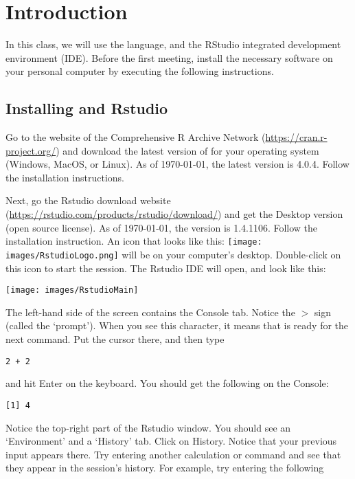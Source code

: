\hypertarget{intro}{%
\chapter{Introduction}\label{intro}}

In this class, we will use the \R language, and the RStudio integrated development environment (IDE). Before the first meeting, install the necessary software on your personal computer by executing the following instructions.

\hypertarget{installing-r-and-rstudio}{%
\section{Installing \R and Rstudio}\label{installing-r-and-rstudio}}

Go to the website of the Comprehensive R Archive Network (\url{https://cran.r-project.org/}) and download the latest version of \R for your operating system (Windows, MacOS, or Linux). As of \today, the latest version is 4.0.4. Follow the installation instructions.

Next, go the Rstudio download website
(\url{https://rstudio.com/products/rstudio/download/}) and get the Desktop version
(open source license). As of \today, the version is 1.4.1106. Follow the
installation instruction. An icon that looks like this:
\texttt{[image: images/RstudioLogo.png]}
will be on your computer's desktop. Double-click on this icon to start the \R session. The Rstudio IDE will open, and look like this:

\begin{center}\texttt{[image: images/RstudioMain]} \end{center}

The left-hand side of the screen contains the Console tab. Notice the \(>\) sign (called the `prompt'). When you see this character, it means that \R is ready for the next command. Put the cursor there, and then type

\begin{verbatim}
2 + 2
\end{verbatim}

and hit Enter on the keyboard. You should get the following on the Console:

\begin{verbatim}
[1] 4
\end{verbatim}

Notice the top-right part of the Rstudio window. You should see an `Environment' and a `History' tab. Click on History. Notice that your previous input appears there. Try entering another calculation or command and see that they appear in the session's history. For example, try entering the following

